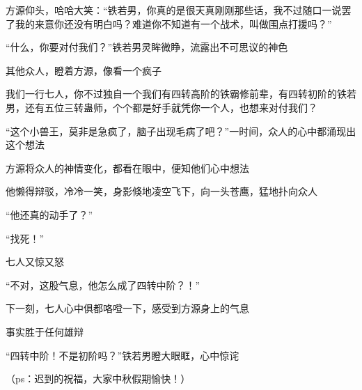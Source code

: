 \begin{this_body}
方源仰头，哈哈大笑：“铁若男，你真的是很天真刚刚那些话，我不过随口一说罢了我的来意你还没有明白吗？难道你不知道有一个战术，叫做围点打援吗？”

“什么，你要对付我们？”铁若男灵眸微睁，流露出不可思议的神色

其他众人，瞪着方源，像看一个疯子

我们一行七人，你不过独自一个我们有四转高阶的铁霸修前辈，有四转初阶的铁若男，还有五位三转蛊师，个个都是好手就凭你一个人，也想来对付我们？

“这个小兽王，莫非是急疯了，脑子出现毛病了吧？”一时间，众人的心中都涌现出这个想法

方源将众人的神情变化，都看在眼中，便知他们心中想法

他懒得辩驳，冷冷一笑，身影倏地凌空飞下，向一头苍鹰，猛地扑向众人

“他还真的动手了？”

“找死！”

七人又惊又怒

“不对，这股气息，他怎么成了四转中阶？！”

下一刻，七人心中俱都咯噔一下，感受到方源身上的气息

事实胜于任何雄辩

“四转中阶！不是初阶吗？”铁若男瞪大眼眶，心中惊诧

（ps：迟到的祝福，大家中秋假期愉快！）

\end{this_body}

